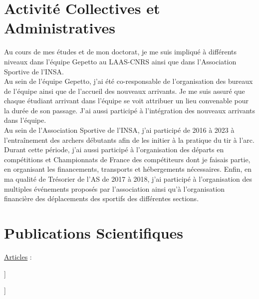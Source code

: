 \documentclass[11pt,a4paper,sans]{moderncv}         %
\begin{document}
\section{Activit\'e Collectives et Administratives}
Au cours de mes \'etudes et de mon doctorat, je me suis impliqu\'e \`a diff\'erents niveaux dans l'\'equipe Gepetto au LAAS-CNRS ainsi que dans l'Association Sportive de l'INSA.\\
Au sein de l'\'equipe Gepetto, j'ai \'et\'e co-responsable de l'organisation des bureaux de l'\'equipe ainsi que de l'accueil des nouveaux arrivants.
Je me suis assur\'e que chaque \'etudiant arrivant dans l'\'equipe se voit attribuer un lieu convenable pour la dur\'ee de son passage.
J'ai aussi particip\'e \`a l'int\'egration des nouveaux arrivants dans l'\'equipe.\\
Au sein de l'Association Sportive de l'INSA, j'ai particip\'e de 2016 \`a 2023 \`a l'entra\^inement des archers d\'ebutants afin de les initier \`a la pratique du tir \`a l'arc.
Durant cette p\'eriode, j'ai aussi particip\'e \`a l'organisation des d\'eparts en comp\'etitions et Championnats de France des comp\'etiteurs dont je faisais partie, en organisant les financements, transports et h\'ebergements n\'ecessaires.
Enfin, en ma qualit\'e de Tr\'esorier de l'AS de 2017 \`a 2018, j'ai particip\'e \`a l'organisation des multiples \'ev\'enements propos\'es par l'association ainsi qu'\`a l'organisation financi\`ere des d\'eplacements des sportifs des diff\'erentes sections.\\
%

\section{Publications Scientifiques}
\toggletrue{myrefs}
\large{\underline{Articles} :}
\begin{itemize}%
\normalsize{\item[[1]\hspace{-2mm}]} \normalsize{}
\normalsize{\item[[2]\hspace{-2mm}]} \normalsize{}
\end{itemize}

\newsavebox\mytempbib
\savebox\mytempbib{\parbox{\textwidth}{}}

\end{document}
